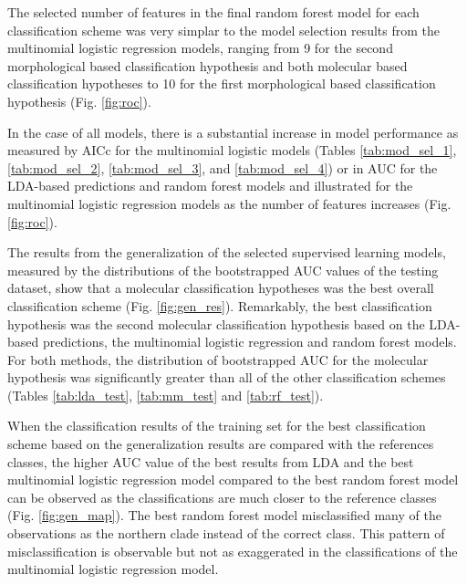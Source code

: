 \documentclass[12pt,letterpaper]{article}\usepackage{graphicx, color}
\begin{document}



The selected number of features in the final random forest model for each classification scheme was very simplar to the model selection results from the multinomial logistic regression models, ranging from 9 for the second morphological based classification hypothesis and both molecular based classification hypotheses to 10 for the first morphological based classification hypothesis (Fig. \ref{fig:roc}). 


In the case of all models, there is a substantial increase in model performance as measured by AICc for the multinomial logistic models (Tables \ref{tab:mod_sel_1}, \ref{tab:mod_sel_2}, \ref{tab:mod_sel_3}, and \ref{tab:mod_sel_4}) or in AUC for the LDA-based predictions and random forest models and illustrated for the multinomial logistic regression models as the number of features increases (Fig. \ref{fig:roc}). 

The results from the generalization of the selected supervised learning models, measured by the distributions of the bootstrapped AUC values of the testing dataset, show that a molecular classification hypotheses was the best overall classification scheme (Fig. \ref{fig:gen_res}). Remarkably, the best classification hypothesis was the second molecular classification hypothesis based on the LDA-based predictions, the multinomial logistic regression and random forest models. For both methods, the distribution of bootstrapped AUC for the molecular hypothesis was significantly greater than all of the other classification schemes (Tables \ref{tab:lda_test}, \ref{tab:mm_test} and \ref{tab:rf_test}). 


When the classification results of the training set for the best classification scheme based on the generalization results are compared with the references classes, the higher AUC value of the best results from LDA and the best multinomial logistic regression model compared to the best random forest model can be observed as the classifications are much closer to the reference classes (Fig. \ref{fig:gen_map}). The best random forest model misclassified many of the observations as the northern clade instead of the correct class. This pattern of misclassification is observable but not as exaggerated in the classifications of the multinomial logistic regression model.
\end{document}
